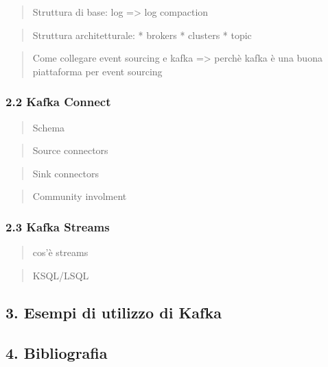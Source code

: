 \documentclass[]{article}
\begin{document}
\begin{quote}
Struttura di base: log =\textgreater{} log compaction
\end{quote}

\begin{quote}
Struttura architetturale: * brokers * clusters * topic
\end{quote}

\begin{quote}
Come collegare event sourcing e kafka =\textgreater{} perchè kafka è una
buona piattaforma per event sourcing
\end{quote}

\subsubsection{2.2 Kafka Connect}\label{kafka-connect}

\begin{quote}
Schema
\end{quote}

\begin{quote}
Source connectors
\end{quote}

\begin{quote}
Sink connectors
\end{quote}

\begin{quote}
Community involment
\end{quote}

\subsubsection{2.3 Kafka Streams}\label{kafka-streams}

\begin{quote}
cos'è streams
\end{quote}

\begin{quote}
KSQL/LSQL
\end{quote}

\subsection{3. Esempi di utilizzo di
Kafka}\label{esempi-di-utilizzo-di-kafka}

\subsection{4. Bibliografia}\label{bibliografia}
\end{document}
